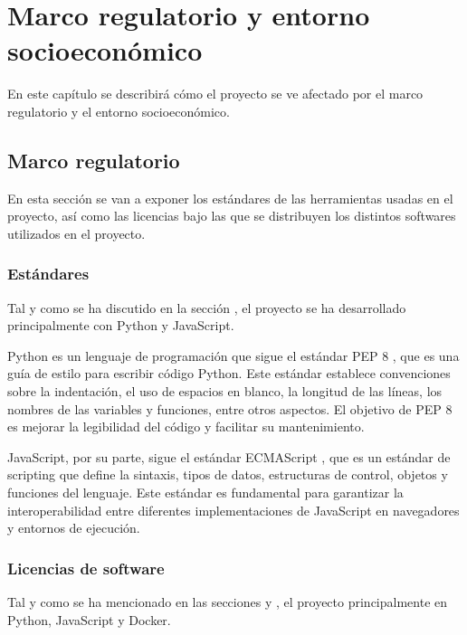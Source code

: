 \chapter{Marco regulatorio y entorno socioeconómico}\label{chap:marco-regulador}

En este capítulo se describirá cómo el proyecto se ve afectado por el marco regulatorio y el entorno socioeconómico.

\section{Marco regulatorio}\label{sec:marco-regulador}

En esta sección se van a exponer los estándares de las herramientas usadas en el proyecto, así como las licencias bajo las que se distribuyen los distintos softwares utilizados en el proyecto.

\subsection{Estándares}\label{subsec:estandares}
Tal y como se ha discutido en la sección , el proyecto se ha desarrollado principalmente con Python y JavaScript.

Python es un lenguaje de programación que sigue el estándar PEP 8 \cite{pep8}, que es una guía de estilo para escribir código Python. Este estándar establece convenciones sobre la indentación, el uso de espacios en blanco, la longitud de las líneas, los nombres de las variables y funciones, entre otros aspectos. El objetivo de PEP 8 es mejorar la legibilidad del código y facilitar su mantenimiento.

JavaScript, por su parte, sigue el estándar ECMAScript \cite{ecmascript}, que es un estándar de scripting que define la sintaxis, tipos de datos, estructuras de control, objetos y funciones del lenguaje. Este estándar es fundamental para garantizar la interoperabilidad entre diferentes implementaciones de JavaScript en navegadores y entornos de ejecución.

\subsection{Licencias de software}\label{subsec:licencias-software}

Tal y como se ha mencionado en las secciones  y , el proyecto principalmente en Python, JavaScript y Docker.


